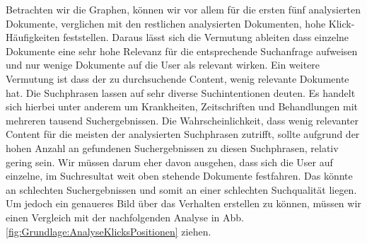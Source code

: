 Betrachten wir die Graphen, können wir vor allem für die ersten fünf analysierten Dokumente, verglichen mit den restlichen analysierten Dokumenten, hohe Klick-Häufigkeiten feststellen. Daraus lässt sich die Vermutung ableiten dass einzelne Dokumente eine sehr hohe Relevanz für die entsprechende Suchanfrage aufweisen und nur wenige Dokumente auf die User als relevant wirken. Ein weitere Vermutung ist dass der zu durchsuchende Content, wenig relevante Dokumente hat. Die Suchphrasen lassen auf sehr diverse Suchintentionen deuten. Es handelt sich hierbei unter anderem um Krankheiten, Zeitschriften und Behandlungen mit mehreren tausend Suchergebnissen. Die Wahrscheinlichkeit, dass wenig relevanter Content für die meisten der analysierten Suchphrasen zutrifft, sollte aufgrund der hohen Anzahl an gefundenen Suchergebnissen zu diesen Suchphrasen, relativ gering sein. Wir müssen darum eher davon ausgehen, dass sich die User auf einzelne, im Suchresultat weit oben stehende Dokumente festfahren. Das könnte an schlechten Suchergebnissen und somit an einer schlechten Suchqualität liegen. Um jedoch ein genaueres Bild über das Verhalten erstellen zu können, müssen wir einen Vergleich mit der nachfolgenden Analyse in Abb. \ref{fig:Grundlage:AnalyseKlicksPositionen} ziehen.